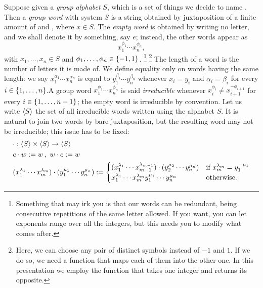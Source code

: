 \begin{example}\label{example:FreeGroup}
  Suppose given a {\em group alphabet} \(S\), which is a set of things
  we decide to name . Then a {\em group word} with system
  \(S\) is a string obtained by juxtaposition of a finite amount of
   and , where \(x \in S\). The {\em empty
    word} is obtained by writing no letter, and we shall denote it by
  something, say \(e\); instead, the other words appear as
  \[x_1^{\phi_1} \cdots{} x_n^{\phi_n},\] with
  \(x_1, \dots{}, x_n \in S\) and
  \(\phi_1, \dots{}, \phi_n \in \left\{-1, 1\right\}\).  \footnote{Something
    that may irk you is that our words can be redundant, being
    consecutive repetitions of the same letter allowed. If you want,
    you can let exponents range over all the integers, but this needs
    you to modify what comes after.}  \footnote{Here, we can choose
    any pair of distinct symbols instead of \(-1\) and \(1\). If we do
    so, we need a function that maps each of them into the other
    one. In this presentation we employ the function that takes one
    integer and returns its opposite.}  \newline
  The length of a word is the number of letters it is made of. We
  define equality only on words having the same length: we say
  \(x_1^{\alpha_1} \cdots{} x_n^{\alpha_n}\) is equal to
  \(y_1^{\beta_1} \cdots{} y_n^{\beta_n}\) whenever \(x_i = y_i\) and
  \(\alpha_i = \beta_i\) for every
  \(i \in \left\{1, \dots{}, n\right\}\).\newline A group word
  \(x_1^{\phi_1} \cdots{} x_n^{\phi_n}\) is said {\em irreducible}
  whenever \(x_i^{\phi_i} \ne x_{i+1}^{-\phi_{i+1}}\) for every
  \(i \in \left\{1, \dots{}, n-1\right\}\); the empty word is irreducible by
  convention. Let us write \(\left\langle S\right\rangle\) the set of all irreducible
  words written using the alphabet \(S\). It is natural to join two
  words by bare juxtaposition, but the resulting word may not be
  irreducible; this issue has to be fixed:
  \[\begin{aligned}
    & \cdot : \angled S \times \angled S \to \angled S \\
    & e \cdot w := w \,, \ w \cdot e := w \\
    & (x_1^{\lambda_1} \cdots{} x_m^{\lambda_m}) \cdot (y_1^{\mu_1} \cdots{} y_n^{\mu_n}) :=
      \begin{cases} (x_1^{\lambda_1} \cdots{} x_{m-1}^{\lambda_{m-1}}) \cdot (y_2^{\mu_2} \cdots{} y_n^{\mu_n}) & \text{if } x_{m}^{\lambda_m} = y_1^{-\mu_1} \\ x_1^{\lambda_1} \cdots{} x_m^{\lambda_m} y_1^{\mu_1} \cdots{} y_n^{\mu_n} & \text{otherwise.} \end{cases}

\end{aligned}\]
\end{example}

